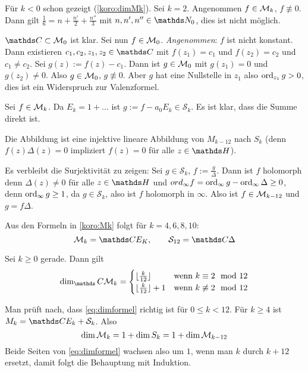 \begin{bewe-list}
	\item  Für $k < 0$ schon gezeigt (\autoref{koro:dimMk}).
	Sei $k = 2$. Angenommen $f \in \mathcal{M}_k$, $f \not\equiv 0$. Dann gilt $\frac{1}{6} = n + \frac{n'}{2} + \frac{n''}{3}$ mit $n, n', n'' \in \NN_0$, dies ist nicht möglich.
	
	\item $\CC \subset \M_0$ ist klar.
	Sei nun $f \in \mathcal{M}_0$. \emph{Angenommen}: $f$ ist nicht konstant.
	Dann existieren $c_1, c_2, z_1, z_2 \in \CC$ mit $f(z_1) = c_1$ und $f(z_2) = c_2$ und $c_1 \not= c_2$.
	Sei $g(z) := f(z) - c_1$. Dann ist $g \in \mathcal{M}_0$ mit $g(z_1) = 0$ und $g(z_2) \not= 0$.
	Also $g \in \mathcal{M}_0$, $g \not\equiv 0$.
	Aber $g$ hat eine Nullstelle in $z_1$ also $\operatorname{ord}_{z_1} g > 0$, dies ist ein Widerspruch zur Valenzformel.
	
	\item Sei $f \in \mathcal{M}_k$. Da $E_k = 1 + ...$ ist $g := f - a_0E_k \in \mathcal{S}_k$.
	Es ist klar, dass die Summe direkt ist.
	
	\item Die Abbildung ist eine injektive lineare Abbildung von $M_{k-12}$ nach $S_k$ (denn $f(z) \Delta(z) = 0$ impliziert $f(z) = 0$ für alle $z\in\HH$).
	
	Es verbleibt die Surjektivität zu zeigen:
	Sei $g \in \mathcal{S}_k$, $f := \frac{g}{\Delta}$.
	Dann ist $f$ holomorph denn $\Delta(z) \not= 0$ für alle $z \in \HH$ und $ord_\infty f = \operatorname{ord}_\infty g - \operatorname{ord}_\infty \Delta \geq 0$, denn $\operatorname{ord}_\infty g \geq 1$, da $g \in \mathcal S_k$, also ist $f$ holomorph in $\infty$. Also ist $f\in\mathcal{M}_{k-12}$ und $g = f\Delta$.
\end{bewe-list}

Aus den Formeln in \autoref{koro:Mk} folgt für $k=4, 6, 8, 10$:
\[
\M_k = \CC E_K, \qquad \mathcal{S}_{12} = \CC\Delta
\]

\begin{koro}
	Sei $k \geq 0$ gerade. Dann gilt
	\begin{equation}\label{eq:dimformel}
	\dim_\CC \M_k=
	\begin{cases}
	\lfloor \frac{k}{12} \rfloor & \text{wenn } k \equiv 2 \mod 12 \\
	\lfloor \frac{k}{12} \rfloor + 1 & \text{wenn } k \not\equiv 2 \mod 12
	\end{cases}
	\end{equation}
\end{koro}

\begin{bewe}
	Man prüft nach, dass \eqref{eq:dimformel} richtig ist für $0 \leq k < 12$.
	Für $k \geq 4$ ist $M_k = \CC E_k + \mathcal{S}_k$.
	Also
	\[
	\dim \mathcal{M}_k = 1 + \dim S_k = 1 + \dim \mathcal{M}_{k-12}
	\]
	Beide Seiten von \eqref{eq:dimformel} wachsen also um $1$, wenn man $k$ durch $k+12$ ersetzt, damit folgt die Behauptung mit Induktion.
\end{bewe}